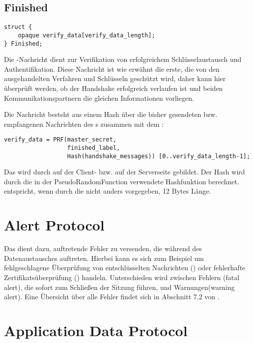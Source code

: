 \subsection*{Finished}

\begin{lstlisting}
struct {
	opaque verify_data[verify_data_length];
} Finished;
\end{lstlisting}

Die \finished{}-Nachricht dient zur Verifikation von erfolgreichem Schlüsselaustausch und Authentifikation. Diese Nachricht ist wie erwähnt die erste, die von den ausgehandelten Verfahren und Schlüsseln geschützt wird, daher kann hier überprüft werden, ob der Handshake erfolgreich verlaufen ist und beiden Kommunikationspartnern die gleichen Informationen vorliegen.

Die Nachricht besteht aus einem Hash über die bisher gesendeten bzw. empfangenen Nachrichten des \handshakeprotocol{}s zusammen mit dem \mastersecret{}:

\begin{lstlisting}
verify_data = PRF(master_secret, 
				  finished_label, 
				  Hash(handshake_messages)) [0..verify_data_length-1];
\end{lstlisting}

Das  wird durch  auf der Client- bzw.  auf der Serverseite gebildet. Der Hash wird durch die in der PseudoRandomFunction verwendete Hashfunktion berechnet.   entspricht, wenn durch die \ciphersuite{} nicht anders vorgegeben, 12 Bytes Länge.

\section{Alert Protocol}

Das \alertprotocol{} dient dazu, auftretende Fehler zu versenden, die während des Datenaustausches auftreten. Hierbei kann es sich zum Beispiel um fehlgeschlagene Überprüfung von entschlüsselten Nachrichten (\badrecordmac{}) oder fehlerhafte Zertifikatsüberprüfung (\badcertificate{}) handeln. Unterschieden wird zwischen Fehlern (fatal alert), die sofort zum Schließen der Sitzung führen, und Warnungen(warning alert). Eine Übersicht über alle Fehler findet sich in Abschnitt 7.2 von \cite{tls12}.

\section{Application Data Protocol}

